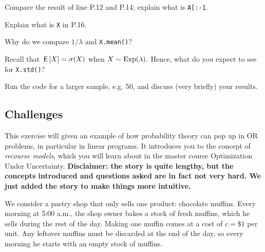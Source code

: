 \documentclass[assignments]{subfiles}
\begin{document}
\begin{exercise}
Compare the result of  line P.12 and P.14;  explain what is \texttt{A[:-1}.
\begin{solution}
\end{solution}
\end{exercise}

\begin{exercise}
 Explain what is \texttt{X} in P.16.
\begin{solution}
\end{solution}
\end{exercise}

\begin{exercise}
Why do we compare $1/\lambda$ and \texttt{X.mean()}?
\begin{solution}
\end{solution}
\end{exercise}

\begin{exercise}
Recall that $\,\mathsf{E}\left[X\right] = \sigma (X)$ when $X\sim \mathrm{Exp}(\lambda)$.
Hence, what do you expect to see for \texttt{X.std()}?
\begin{solution}
\end{solution}
\end{exercise}

\begin{exercise}
 Run the code for a larger sample, e.g. 50, and discuss (very briefly) your results.
\begin{solution}
\end{solution}
\end{exercise}




\subsection{Challenges}
\label{sec:challenges}

This exercise will given an example of how probability theory can pop up in OR problems, in particular in linear programs. It introduces you to the concept of \textit{recourse models}, which you will learn about in the master course Optimization Under Uncertainty. \textbf{Disclaimer: the story is quite lengthy, but the concepts introduced and questions asked are in fact not very hard. We just added the story to make things more intuitive.}

We consider a pastry shop that only sells one product: chocolate muffins. Every morning at 5:00 a.m., the shop owner bakes a stock of fresh muffins, which he sells during the rest of the day. Making one muffin comes at a cost of $c = \$ 1$ per unit. Any leftover muffins must be discarded at the end of the day, so every morning he starts with an empty stock of muffins.
\end{document}
